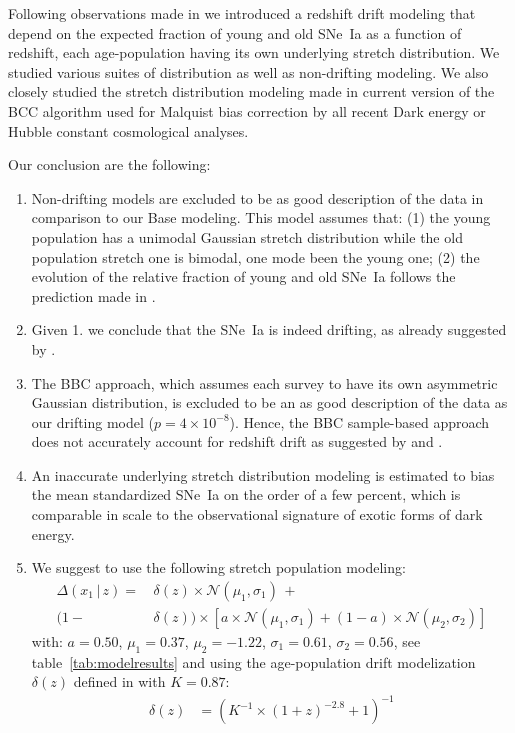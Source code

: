 \documentclass[]{aa} %
\begin{document}
Following observations made in \cite{rigault2018} we introduced a redshift drift
modeling that depend on the expected fraction of young and old SNe~Ia as a
function of redshift, each age-population having its own underlying stretch
distribution. We studied various suites of distribution as well as non-drifting
modeling. We also closely studied the stretch distribution modeling made in
current version of the BCC algorithm used for Malquist bias correction by all
recent Dark energy or Hubble constant cosmological analyses. 

Our conclusion are the following:
\begin{enumerate}

    \item Non-drifting models are excluded to be as good description of the data
        in comparison to our Base modeling.  This model assumes that: (1) the
        young population has a unimodal Gaussian stretch distribution while the
        old population stretch one is bimodal, one mode been the young one; (2)
        the evolution of the relative fraction of young and old SNe~Ia follows
        the prediction made in \cite{rigault2018}. 

    \item Given 1. we conclude that the SNe~Ia is indeed drifting, as already
        suggested by \citep[e.g.][]{howell2007}. 

    \item The BBC approach, which assumes each survey to have its own asymmetric
        Gaussian distribution, is excluded to be an as good description of the
        data as our drifting model ($p=4\times10^{-8}$). Hence, the BBC
        sample-based approach does not accurately account for redshift drift as
        suggested by \cite{scolnic2016} and \cite{scolnic2018a}.

    \item An inaccurate underlying stretch distribution modeling is estimated to
        bias the mean standardized SNe~Ia on the order of a few percent, which
        is comparable in scale to the observational signature of exotic forms of
        dark energy.

    \item We suggest to use the following stretch population modeling:
    \begin{align}
    \label{eqconclusion:stretchz}
        \Delta\left(x_1\,|\,z \right) =
        &\,\delta(z)\times\mathcal{N}(\mu_1,\sigma_1)\,+\nonumber\\
        (1-&\,\delta(z)) \times  \left[a\times\mathcal{N}(\mu_1,\sigma_1) +
        (1-a)\times\mathcal{N}(\mu_2,\sigma_2)\right]\nonumber
    \end{align}
    with: $a=0.50$, $\mu_1=0.37$, $\mu_2=-1.22$, $\sigma_1=0.61$,
    $\sigma_2=0.56$, see table~\ref{tab:modelresults} and using the
    age-population drift modelization $\delta(z)$ defined in \cite{rigault2018}
    with $K=0.87$:
    \begin{align}
        \delta(z) & = \left( K^{-1} \times (1+z)^{-2.8} +1 \right)^{-1}\nonumber
    \end{align}
\end{enumerate}
\end{document}
